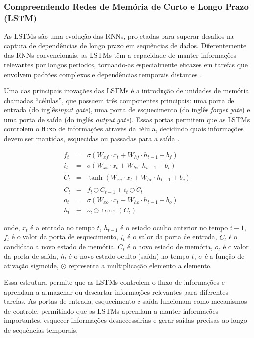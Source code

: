 \subsubsection{Compreendendo Redes de Mem\'oria de Curto e Longo Prazo (LSTM)}

As LSTMs são uma evolução das RNNs, projetadas para superar desafios na captura de dependências de longo prazo em sequências de dados. Diferentemente das RNNs convencionais, as LSTMs têm a capacidade de manter informações relevantes por longos períodos, tornando-as especialmente eficazes em tarefas que envolvem padrões complexos e dependências temporais distantes \cite{Zhang2021}.

Uma das principais inovações das LSTMs é a introdução de unidades de memória chamadas ``células'', que possuem três componentes principais: uma porta de entrada (do inglês\textit{input gate}), uma porta de esquecimento (do inglês \textit{forget gate}) e uma porta de saída (do inglês \textit{output gate}). Essas portas permitem que as LSTMs controlem o fluxo de informações através da célula, decidindo quais informações devem ser mantidas, esquecidas ou passadas para a saída \cite{Zhang2021}.



\begin{eqnarray}
	f_t &=& \sigma(W_{xf} \cdot x_t + W_{hf} \cdot h_{t-1} + b_f) \\
	i_t &=& \sigma(W_{xi} \cdot x_t + W_{hi} \cdot h_{t-1} + b_i) \\
	\tilde{C}_t &=& \tanh(W_{xc} \cdot x_t + W_{hc} \cdot h_{t-1} + b_c) \\
	C_t &=& f_t \odot C_{t-1} + i_t \odot \tilde{C}_t \\
	o_t &=& \sigma(W_{xo} \cdot x_t + W_{ho} \cdot h_{t-1} + b_o) \\
	h_t &=& o_t \odot \tanh(C_t)
\end{eqnarray}


\noindent onde, \(x_t\) é a entrada no tempo \(t\), \(h_{t-1}\) é o estado oculto anterior no tempo \(t-1\), \(f_t\) é o valor da porta de esquecimento, \(i_t\) é o valor da porta de entrada, \(\tilde{C}_t\) é o candidato a novo estado de memória, \(C_t\) é o novo estado de memória, \(o_t\) é o valor da porta de saída, \(h_t\) é o novo estado oculto (saída) no tempo \(t\), \(\sigma\) é a função de ativação sigmoide, \(\odot\) representa a multiplicação elemento a elemento.

Essa estrutura permite que as LSTMs controlem o fluxo de informações e aprendam a armazenar ou descartar informações relevantes para diferentes tarefas. As portas de entrada, esquecimento e saída funcionam como mecanismos de controle, permitindo que as LSTMs aprendam a manter informações importantes, esquecer informações desnecessárias e gerar saídas precisas ao longo de sequências temporais.

